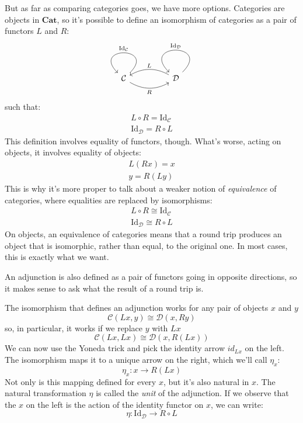 \documentclass[DaoFP]{subfiles}
\begin{document}
But as far as comparing categories goes, we have more options. Categories are objects in $\mathbf{Cat}$, so it's possible to define an isomorphism of categories as a pair of functors $L$ and $R$:
\[
 \begin{tikzcd}
  \mathcal{C}
  \arrow[rr, bend right, "R"']
  \arrow[loop, "\text{Id}_{ \mathcal{C}} "']
  &&
  \mathcal{D}
  \arrow[ll, bend right, "L"']
  \arrow[loop, "\text{Id}_{ \mathcal{D}} "']
  \end{tikzcd}
\]
such that:
\begin{align*}
L \circ R = \text{Id}_{ \mathcal{C}} \\
\text{Id}_{ \mathcal{D}} = R \circ L 
\end{align*}
This definition involves equality of functors, though. What's worse, acting on objects, it involves equality of objects:
\begin{align*}
 L (R x) = x \\
 y = R (L y)
\end{align*}
This is why it's more proper to talk about a weaker notion of \emph{equivalence} of categories, where equalities are replaced by isomorphisms:
\begin{align*}
L \circ R \cong \text{Id}_{ \mathcal{C}} \\
 \text{Id}_{ \mathcal{D}} \cong R \circ L 
\end{align*}
On objects, an equivalence of categories means that a round trip produces an object that is isomorphic, rather than equal, to the original one. In most cases, this is exactly what we want.

An adjunction is also defined as a pair of functors going in opposite directions, so it makes sense to ask what the result of a round trip is. 

The isomorphism that defines an adjunction works for any pair of objects $x$ and $y$
\[  \mathcal{C} (L x, y) \cong \mathcal{D}( x , R y)\]
so, in particular, it works if we replace $y$ with $L x$
\[  \mathcal{C} (L x, L x) \cong \mathcal{D}( x , R (L x))\]
We can now use the Yoneda trick and pick the identity arrow $id_{L x}$ on the left. The isomorphism maps it to a unique arrow on the right, which we'll call $\eta_x$:
\[ \eta_x \colon x \to R ( L x) \]
Not only is this mapping defined for every $x$, but it's also natural in $x$. The natural transformation $\eta$ is called the \emph{unit} of the adjunction. If we observe that the $x$ on the left is the action of the identity functor on $x$, we can write:
\[ \eta \colon \text{Id}_{\mathcal{D}} \to R \circ L \]
\end{document}
